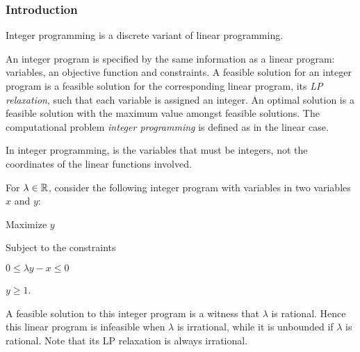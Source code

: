 


\subsubsection{Introduction}\label{IPintro}

Integer programming is a discrete variant of linear programming.

\begin{definition}
    An integer program is specified by the same information as a linear program: variables, an objective function and constraints.
    A feasible solution for an integer program is a feasible solution for the corresponding linear program, its \textit{LP relaxation}, such that each variable is assigned an integer.
    An optimal solution is a feasible solution with the maximum value amongst feasible solutions.
    The computational problem \textit{integer programming} is defined as in the linear case.
\end{definition}

\begin{remark}
    In integer programming, is the variables that must be integers, not the coordinates of the linear functions involved.
\end{remark}

\begin{example}
    For $\lambda \in \mathbb{R}$, consider the following integer program with variables in two variables $x$ and $y$:

\begin{center}
Maximize $y$

Subject to the constraints

$0 \leq \lambda y - x \leq 0$

$y \geq 1$.

\end{center}

A feasible solution to this integer program is a witness that $\lambda$ is rational.
Hence this linear program is infeasible when $\lambda$ is irrational, while it is unbounded if $\lambda$ is rational.
Note that its LP relaxation is always irrational.
\end{example}

